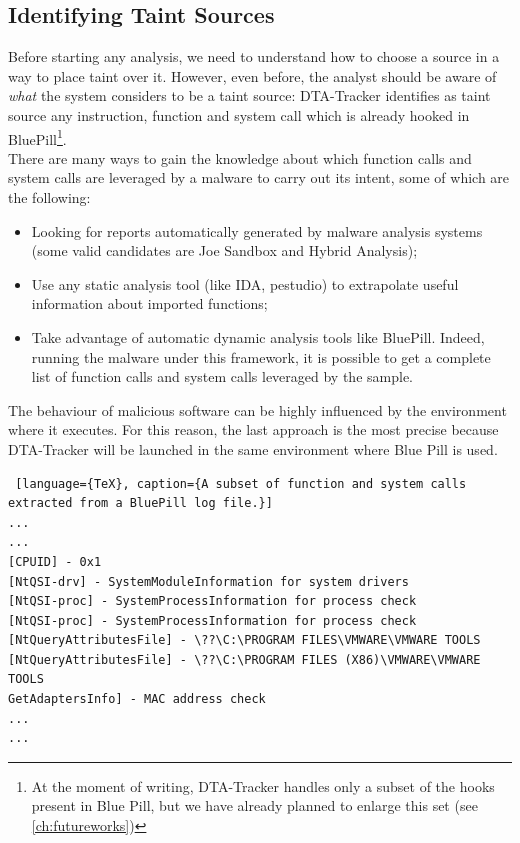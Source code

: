 \documentclass[LaM,binding=0.6cm]{sapthesis}
\begin{document}
\subsection{Identifying Taint Sources}
\label{subsec:identifyingtaintsources}
Before starting any analysis, we need to understand how to choose a source in a way to place taint over it. However, even before, the analyst should be aware of \textit{what} the system considers to be a taint source: DTA-Tracker identifies as taint source any instruction, function and system call which is already hooked in BluePill\footnote{At the moment of writing, DTA-Tracker handles only a subset of the hooks present in Blue Pill, but we have already planned to enlarge this set (see \autoref{ch:futureworks})}.\\

There are many ways to gain the knowledge about which function calls and system calls are leveraged by a malware to carry out its intent, some of which are the following:
\begin{itemize}
\item Looking for reports automatically generated by malware analysis systems (some valid candidates are Joe Sandbox and Hybrid Analysis);
\item Use any static analysis tool (like IDA, pestudio) to extrapolate useful information about imported functions;
\item Take advantage of automatic dynamic analysis tools like BluePill. Indeed, running the malware under this framework, it is possible to get a complete list of function calls and system calls leveraged by the sample. 
\end{itemize}
The behaviour of malicious software can be highly influenced by the environment where it executes. For this reason, the last approach is the most precise because DTA-Tracker will be launched in the same environment where Blue Pill is used.
\begin{lstlisting} [language={TeX}, caption={A subset of function and system calls extracted from a BluePill log file.}]
...
...
[CPUID] - 0x1
[NtQSI-drv] - SystemModuleInformation for system drivers
[NtQSI-proc] - SystemProcessInformation for process check
[NtQSI-proc] - SystemProcessInformation for process check
[NtQueryAttributesFile] - \??\C:\PROGRAM FILES\VMWARE\VMWARE TOOLS
[NtQueryAttributesFile] - \??\C:\PROGRAM FILES (X86)\VMWARE\VMWARE TOOLS
GetAdaptersInfo] - MAC address check
...
...
\end{lstlisting}
\end{document}
